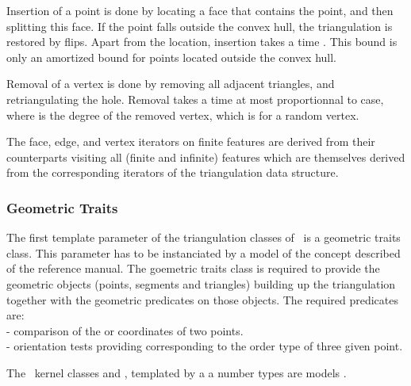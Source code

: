 Insertion of a point is done by locating a face that contains the
point, and then splitting this face.
If the point falls outside the convex hull, the triangulation
 is restored by flips.  Apart from the location, insertion takes a
time . This bound is only an amortized bound
for points located outside the convex hull.

Removal of a vertex is done by removing all adjacent triangles, and
retriangulating the hole. Removal takes a time  at most proportionnal to
 case, where
  is the degree of the removed vertex,
which is  for a random vertex.

The face, edge, and vertex iterators on finite features
are derived from their counterparts visiting all (finite and infinite)
features which are themselves derived from the corresponding iterators
of the triangulation data structure.


\subsubsection{ Geometric Traits}
\label{Subsubsection_2D_Triangulation_Basic_Geomrtric_Traits}

The first template parameter of the triangulation classes of \cgal\ 
is a geometric traits class. This parameter has to be instanciated by
a model of the concept
 described  of the reference manual.
 The goemetric traits class 
is required to provide
the geometric objects (points, segments and triangles)
building up the triangulation
together with the geometric predicates on those objects.
The required predicates are: \\
- comparison of the  or  coordinates of two points.\\
- orientation tests providing \ccc{CGAL_orientation}
  corresponding to the order type of three given point.

The \cgal\  kernel classes  and
,
templated by a  a number types  
are models .

